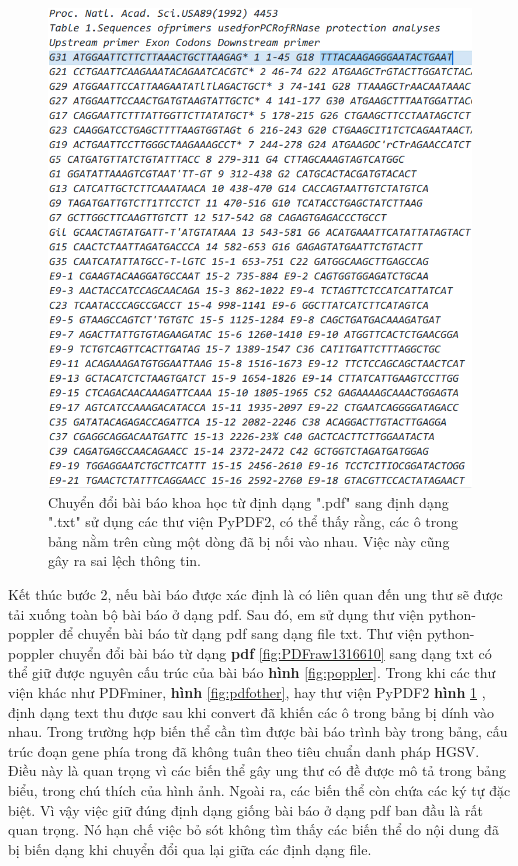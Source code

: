 \documentclass[../DoAn.tex]{subfiles}
\begin{document}
\begin{figure}
\centering
\includegraphics[width=1.0\linewidth]{Hinh_ve/notPopller_pyPDF2.png}
\caption{Chuyển đổi bài báo khoa học từ định dạng ".pdf" sang định dạng ".txt" sử dụng các thư viện PyPDF2, có thể thấy rằng, các ô trong bảng nằm trên cùng một dòng đã bị nối vào nhau. Việc này cũng gây ra sai lệch thông tin.}
\label{fig:Pypdf2}
\end{figure}

Kết thúc bước 2, nếu bài báo được xác định là có liên quan đến ung thư sẽ được tải xuống toàn bộ bài báo ở dạng pdf. Sau đó, em sử dụng thư viện python-poppler để chuyển bài báo từ dạng pdf sang dạng file txt. Thư viện python-poppler chuyển đổi bài báo từ dạng \textbf{pdf} \ref{fig:PDFraw1316610} sang dạng txt có thể giữ được nguyên cấu trúc của bài báo \textbf{hình} \ref{fig:poppler}. Trong khi các thư viện khác như PDFminer, \textbf{hình} \ref{fig:pdfother}, hay thư viện PyPDF2 \textbf{hình} \ref{fig:Pypdf2} , định dạng text thu được sau khi convert đã khiến các ô trong bảng bị dính vào nhau. Trong trường hợp biến thể cần tìm được bài báo trình bày trong bảng, cấu trúc đoạn gene phía trong đã không tuân theo tiêu chuẩn danh pháp HGSV. Điều này là quan trọng vì các biến thể gây ung thư có đề được mô tả trong bảng biểu, trong chú thích của hình ảnh. Ngoài ra, các biến thể còn chứa các ký tự đặc biệt. Vì vậy việc giữ đúng định dạng giống bài báo ở dạng pdf ban đầu là rất quan trọng. Nó hạn chế việc bỏ sót không tìm thấy các biến thể do nội dung đã bị biến dạng khi chuyển đổi qua lại giữa các định dạng file.
\end{document}
